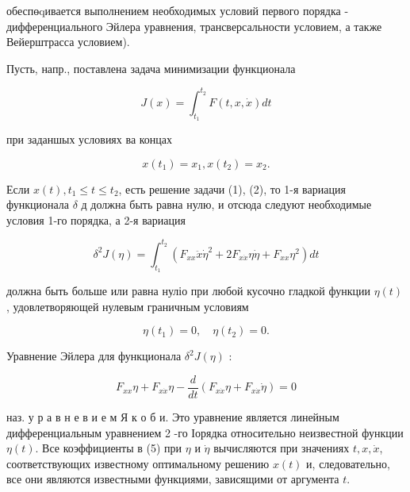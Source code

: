 \documentclass[10pt]{article}
\begin{document}
обеспөqивается выполнением необходимых условий первого порядка - дифференциального Эйлера уравнения, трансверсальности условием, а также Вейерштрасса условием).



Пусть, напр., поставлена задача минимизации функционала



\[

J(x)=\int_{t_{1}}^{t_{2}} F(t, x, \dot{x}) d t

\]



при заданшых условиях ва концах



\[

x\left(t_{1}\right)=x_{1}, x\left(t_{2}\right)=x_{2} .

\]



Если $x(t), t_{1} \leqslant t \leqslant t_{2}$, есть решение задачи (1), (2), то 1-я вариация функционала $\delta$ д должна быть равна нулю, и отсюда следуют необходимые условия 1-го порядка, а 2-я вариация



\[

\delta^{2} J(\eta)=\int_{t_{1}}^{t_{2}}\left(F_{x x} \ddot{x} \dot{\eta}^{2}+2 F_{x \dot{x}} \eta \dot{\eta}+F_{x x} \eta^{2}\right) d t

\]



должна быть больше или равна нуліо при любой кусочно гладкой функции $\eta(t)$, удовлетворяющей нулевым граничным условиям



\[

\eta\left(t_{1}\right)=0, \quad \eta\left(t_{2}\right)=0 .

\]



Уравнение Эйлера для функционала $\delta^{2} J(\eta)$ :



\[

F_{x x} \eta+F_{x \dot{x}} \eta-\frac{d}{d t}\left(F_{x \dot{x}} \eta+F_{x \dot{x}} \dot{\eta}\right)=0

\]



наз. у р а в н е в и е м Я к о б и. Это уравнение является линейным дифференциальным уравнением 2 -го Іорядка относительно неизвестной функции $\eta(t)$. Все коэффициенты в (5) при $\eta$ и $\dot{\eta}$ вычисляются при значениях $t, x, \dot{x}$, соответствующих известному оптимальному решению $x(t)$ и, следовательно, все они являются известными функциями, зависящими от аргумента $t$.
\end{document}
